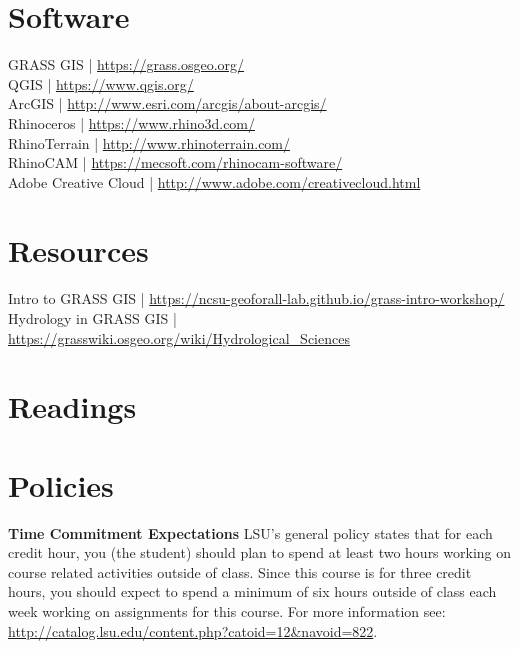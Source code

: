\documentclass[11pt,article,oneside]{memoir}
\begin{document}
\section{Software}
GRASS GIS | \url{https://grass.osgeo.org/}\\
QGIS | \url{https://www.qgis.org/}\\
ArcGIS | \url{http://www.esri.com/arcgis/about-arcgis/}\\
Rhinoceros | \url{https://www.rhino3d.com/}\\
RhinoTerrain | \url{http://www.rhinoterrain.com/}\\
RhinoCAM | \url{https://mecsoft.com/rhinocam-software/}\\
Adobe Creative Cloud | \url{http://www.adobe.com/creativecloud.html}\\

\section{Resources}
Intro to GRASS GIS | \url{https://ncsu-geoforall-lab.github.io/grass-intro-workshop/}\\
Hydrology in GRASS GIS | \url{https://grasswiki.osgeo.org/wiki/Hydrological_Sciences}\\

\clearpage
\section{Readings}
\renewcommand*{\bibfont}{\normalsize} %
\vspace*{0.5cm}
\nocite{*}
\setlength{}
\printbibliography[heading=none]

\clearpage

\section{Policies}

\noindent \textbf{Time Commitment Expectations}
LSU's general policy states that for each credit hour, you (the student) should plan to
spend at least two hours working on course related activities outside of class. Since this course is for three credit hours, you should expect to spend a minimum of six hours outside of class each week working on assignments for this course. For more information see: 
\url{http://catalog.lsu.edu/content.php?catoid=12&navoid=822}.\\
\end{document}
